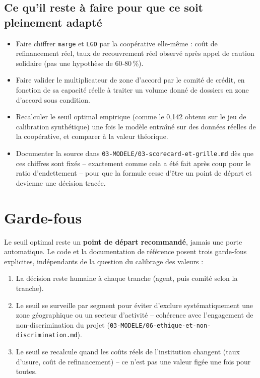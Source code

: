 \documentclass[11pt,a4paper]{article}
\begin{document}
\subsection{Ce qu'il reste à faire pour que ce soit pleinement adapté}

\begin{itemize}
\item Faire chiffrer \texttt{marge} et \texttt{LGD} par la coopérative elle-même : coût de
refinancement réel, taux de recouvrement réel observé après appel de caution solidaire (pas une
hypothèse de 60-80\,\%).
\item Faire valider le multiplicateur de zone d'accord par le comité de crédit, en fonction de sa
capacité réelle à traiter un volume donné de dossiers en zone d'accord sous condition.
\item Recalculer le seuil optimal empirique (comme le 0,142 obtenu sur le jeu de calibration
synthétique) une fois le modèle entraîné sur des données réelles de la coopérative, et comparer à
la valeur théorique.
\item Documenter la source dans \texttt{03-MODELE/03-scorecard-et-grille.md} dès que ces chiffres
sont fixés -- exactement comme cela a été fait après coup pour le ratio d'endettement -- pour que
la formule cesse d'être un point de départ et devienne une décision tracée.
\end{itemize}

\section{Garde-fous}

Le seuil optimal reste un \textbf{point de départ recommandé}, jamais une porte automatique. Le
code et la documentation de référence posent trois garde-fous explicites, indépendants de la
question du calibrage des valeurs :

\begin{enumerate}
\item La décision reste humaine à chaque tranche (agent, puis comité selon la tranche).
\item Le seuil se surveille par segment pour éviter d'exclure systématiquement une zone
géographique ou un secteur d'activité -- cohérence avec l'engagement de non-discrimination du
projet (\texttt{03-MODELE/06-ethique-et-non-discrimination.md}).
\item Le seuil se recalcule quand les coûts réels de l'institution changent (taux d'usure, coût de
refinancement) -- ce n'est pas une valeur figée une fois pour toutes.
\end{enumerate}
\end{document}
